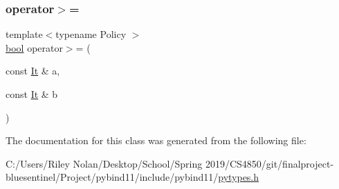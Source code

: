 \subsubsection{\texorpdfstring{operator$>$=}{operator>=}}
{\footnotesize\ttfamily template$<$typename Policy $>$ \\
\mbox{\hyperlink{asdl_8h_af6a258d8f3ee5206d682d799316314b1}{bool}} operator$>$= (\begin{DoxyParamCaption}\item[{const \mbox{\hyperlink{classgeneric__iterator}{It}} \&}]{a,  }\item[{const \mbox{\hyperlink{classgeneric__iterator}{It}} \&}]{b }\end{DoxyParamCaption})\hspace{0.3cm}{\ttfamily [friend]}}



The documentation for this class was generated from the following file\+:\begin{DoxyCompactItemize}
\item 
C\+:/\+Users/\+Riley Nolan/\+Desktop/\+School/\+Spring 2019/\+C\+S4850/git/finalproject-\/bluesentinel/\+Project/pybind11/include/pybind11/\mbox{\hyperlink{pytypes_8h}{pytypes.\+h}}\end{DoxyCompactItemize}
